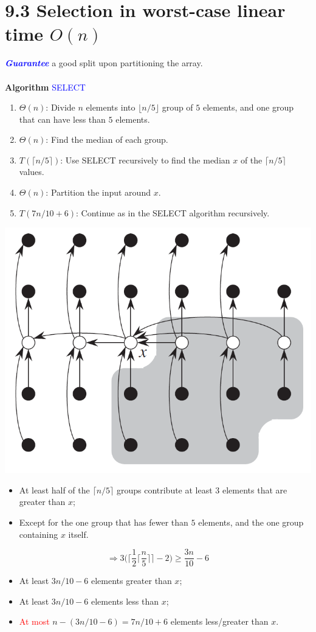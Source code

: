 \documentclass[a4paper]{article}
\begin{document}
\section*{9.3 Selection in worst-case linear time $O(n)$}
\textcolor{blue}{\textit{\textbf{Guarantee}}} a good split upon partitioning the array.\\
\\
\textbf{Algorithm} \textcolor{blue}{SELECT}
\begin{enumerate}
    \item $\Theta(n)$: Divide $n$ elements into $\lfloor n/5 \rfloor$ group of $5$ elements, and one group that can have less than $5$ elements.
    \item $\Theta(n)$: Find the median of each group.
    \item $T(\lceil n/5 \rceil)$: Use SELECT recursively to find the median $x$ of the $\lceil n/5 \rceil$ values.
    \item $\Theta(n)$: Partition the input around $x$.
    \item $T(7n/10+6)$: Continue as in the SELECT algorithm recursively.
\end{enumerate}
\includegraphics[scale=0.5]{"algorithm SELECT"}
\begin{itemize}
    \item At least half of the $\lceil n/5\rceil$ groups contribute at least $3$ elements that are greater than $x$;
    \item Except for the one group that has fewer than $5$ elements, and the one group containing $x$ itself.
\end{itemize}
\begin{equation*}
    \Rightarrow 3\Bigg(\bigg\lceil\frac{1}{2}\Big\lceil\frac{n}{5}\Big\rceil\bigg\rceil-2\Bigg)\geq \frac{3n}{10}-6
\end{equation*}
\begin{itemize}
    \item At least $3n/10-6$ elements greater than $x$;
    \item At least $3n/10-6$ elements less than $x$;
    \item \textcolor{red}{At most} $n-(3n/10-6)=7n/10+6$ elements less/greater than $x$.
\end{itemize}
\end{document}
